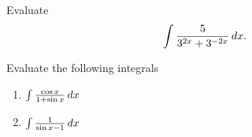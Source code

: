 \documentclass[noinstructornotes]{ximera}
\begin{document}
\begin{instructorNotes}

\end{instructorNotes}







\begin{problem}
Evaluate
	\[
	\int \frac{5}{3^{2x} + 3^{-2x}} \,d x.
	\]
	\begin{freeResponse}
	
	\end{freeResponse}
		
\end{problem}

\begin{instructorNotes}

\end{instructorNotes}







\begin{problem}
Evaluate the following integrals
	\begin{enumerate}
	
	\item  $\int \frac{\cos x}{1 + \sin x} \,d x$
	\begin{freeResponse}
	
	\end{freeResponse}
	
	
	
	\item  $ \int \frac{1}{\sin x - 1} \,d x$
	\begin{freeResponse}
	
	\end{freeResponse}
	
	\end{enumerate}

\end{problem}

\begin{instructorNotes}

\end{instructorNotes}
\end{document}
